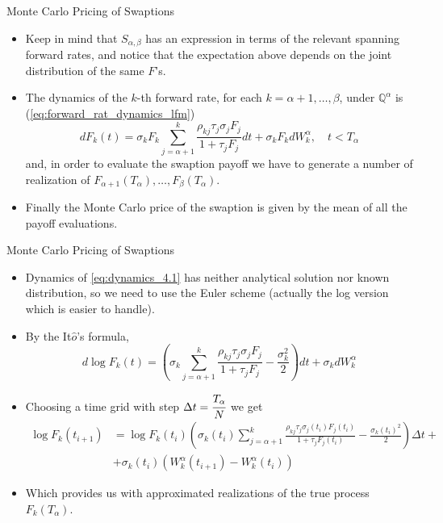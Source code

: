 \documentclass{beamer}
\begin{document}
\begin{frame}{Monte Carlo Pricing of Swaptions}
  \begin{itemize}
  \item<1-> Keep in mind that $S_{\alpha,\beta}$ has an expression in terms of the relevant spanning forward rates, and notice that the expectation above depends on the joint distribution of the same $F$’s.
  \item<2-> The dynamics of the $k$-th forward rate, for each $k = \alpha + 1,\ldots, \beta$, under $\mathbb{Q}^\alpha$ is (\cref{eq:forward_rat_dynamics_lfm})
\begin{equation}
  dF_k(t) = \sigma_kF_k\sum_{j=\alpha+1}^k\frac{\rho_{kj}\tau_j\sigma_jF_j}{1+\tau_jF_j}dt+\sigma_kF_k dW^\alpha_k, \quad t<T_\alpha
  \label{eq:dynamics_4.1}
\end{equation}
and, in order to evaluate the swaption payoff we have to generate a number of realization of $F_{\alpha+1}(T_\alpha),\ldots, F_\beta(T_\alpha)$. 
\item<3-> Finally the Monte Carlo price of the swaption is given by the mean of all the payoff evaluations.
  \end{itemize}
\end{frame}

\begin{frame}{Monte Carlo Pricing of Swaptions}
  \begin{itemize}
  \item<1-> Dynamics of \cref{eq:dynamics_4.1} has neither analytical solution nor known distribution, so we need to use the Euler scheme (actually the log version which is easier to handle).
  \item<2-> By the It$\hat{o}$’s formula,
    \begin{equation*}
      d\log F_k(t) = \left(\sigma_k\sum_{j=\alpha+1}^k\frac{\rho_{kj}\tau_j\sigma_jF_j}{1+\tau_jF_j}-\frac{\sigma_k^2}{2}\right)dt+\sigma_k dW^\alpha_k
    \end{equation*}
  \item<3-> Choosing a time grid with step $\Delta t = \cfrac{T_\alpha}{N}$ we get
    \begin{equation*}
      \begin{aligned}
        \log F_k(t_{i+1}) &=\log F_k(t_i) \left(\sigma_k(t_i)\sum_{j=\alpha+1}^k\frac{\rho_{kj}\tau_j\sigma_j(t_i)F_j(t_i)}{1+\tau_jF_j(t_i)}-\frac{\sigma_k(t_i)^2}{2}\right)\Delta t + \\
        &+\sigma_k(t_i) (W^\alpha_k(t_{i+1}) - W^\alpha_k(t_i))
      \end{aligned}
    \end{equation*}
  \item<4-> Which provides us with approximated realizations of the true process $F_k(T_\alpha)$.
  \end{itemize}
\end{frame}
\end{document}
